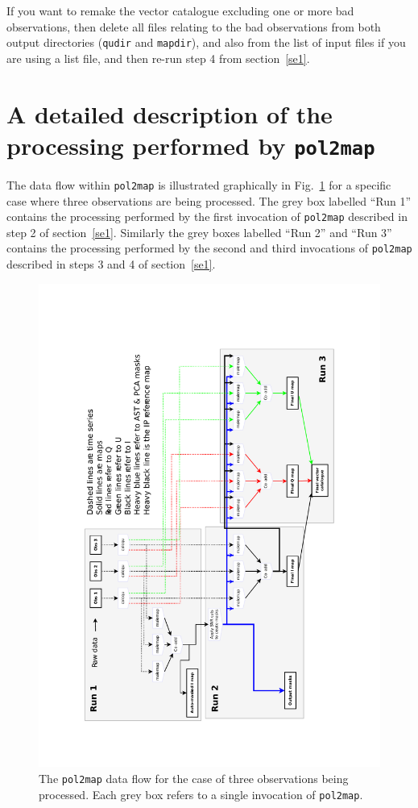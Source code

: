 \documentclass[twoside,11pt]{starlink}
\begin{document}
If you want to remake the vector catalogue excluding one or more bad
observations, then delete all files relating to the bad observations from
both output directories (\texttt{qudir} and \texttt{mapdir}), and also
from the list of input files if you are using a list file, and then
re-run step 4 from section~\ref{se1}.

\section{A detailed description of the processing performed by \texttt{pol2map}}

The data flow within \texttt{pol2map} is illustrated graphically in
Fig.~\ref{fig:flow} for a specific case where three observations are
being processed. The grey box labelled ``Run 1'' contains the processing
performed by the first invocation of \texttt{pol2map} described in step 2
of section~\ref{se1}. Similarly the grey boxes labelled ``Run 2'' and ``Run
3'' contains the processing performed by the second and third invocations
of \texttt{pol2map} described in steps 3 and 4 of section~\ref{se1}.

\begin{figure}
\includegraphics[width=.99\linewidth]{pol2map_flow.pdf}
\caption{The \texttt{pol2map} data flow for the case of three
observations being processed. Each grey box refers to a single invocation
of \texttt{pol2map}.}
\label{fig:flow}
\end{figure}
\end{document}
